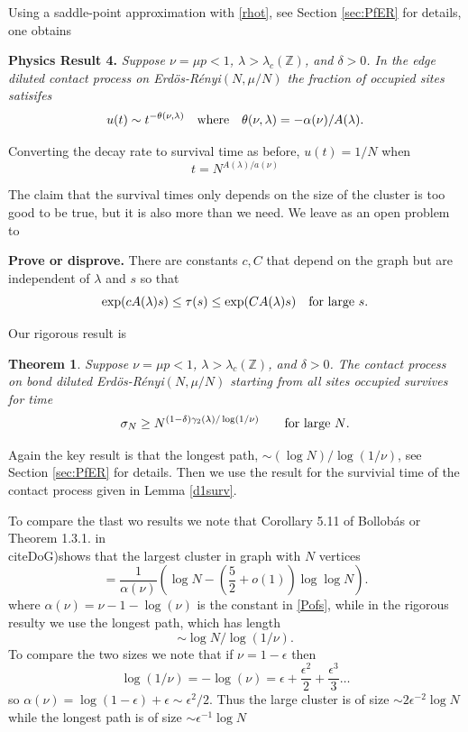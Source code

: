 \documentclass[11pt]{article}
\newtheorem{theorem}{Theorem}
\theoremstyle{definition}
\def\beq{ \begin{equation} }
\def\eeq{ \end{equation} }
\def\mn{\medskip\noindent}
\def\ep{\epsilon}
\def\ZZ{\mathbb{Z}}
\def\ERns{Erd\"os-R\'enyi}
\begin{document}
\noindent
Using a saddle-point approximation with \eqref{rhot}, see Section \ref{sec:PfER} for details, one obtains

\mn
{\bf Physics Result 4.}
{\it Suppose $\nu = \mu p < 1$,  $\lambda > \lambda_c(\ZZ)$, and $\delta>0$.  In the edge diluted contact process on \ERns$(N,\mu/N)$ the fraction of occupied sites
 satisifes}
$$
u(t) \sim t^{-\theta(\nu,\lambda)}\quad\hbox{where}\quad
\theta(\nu,\lambda) = -\alpha(\nu)/A(\lambda).
$$

\mn
Converting the decay rate to survival time as before, $u(t)=1/N$ when 
\beq
t=N^{A(\lambda)/a(\nu)}
\label{physpre}
\eeq


The claim that the survival times only depends on the size of the cluster
is too good to be true, but it is also more than we need. We leave as an open problem to


\mn
{\bf Prove or disprove.} There are constants $c,C$ that depend on the graph but are independent of $\lambda$ and $s$  so that
$$
\exp(cA(\lambda) s ) \le \tau(s) \le \exp(CA(\lambda) s ) \quad \hbox{for large $s$}.
$$



\medskip
Our rigorous result is 


\begin{theorem} \label{GphaseER}
Suppose $\nu = \mu p < 1$,  $\lambda > \lambda_c(\ZZ)$, and $\delta>0$.  The  contact process on bond diluted \ERns$(N,\mu/N)$ starting from all sites occupied survives for time
\beq
\sigma_N \ge N^{(1-\delta) \gamma_2(\lambda)/\log(1/\nu)}
\qquad\hbox{for large $N$.}
\label{ERsurvbd}
\eeq
\end{theorem}

\mn
Again the key result is that the longest path,  $\sim (\log N)/\log(1/\nu)$, see  Section \ref{sec:PfER} for details. Then we use the result for the survivial time of the contact process given in Lemma \ref{d1surv}.


\medskip
To compare the tlast wo results we note that  Corollary 5.11 of Bollob\'as \cite{Boll} or Theorem 1.3.1. in \\cite{DoG})shows that the largest cluster in graph with $N$ vertices
$$
= \frac{1}{\alpha(\nu)}\left( \log N - \left( \frac{5}{2} + o(1) \right) \log\log N \right).
$$ 
where $\alpha(\nu)=\nu-1-\log(\nu)$ is the constant in \eqref{Pofs}, while in the rigorous resulty we use the longest path, which has length 
$$
\sim\log N/ \log(1/\nu). 
$$
To compare the two sizes we note that if $\nu = 1 - \ep$ then  
$$
\log(1/\nu) = - \log(\nu) =  \ep + \frac{\ep^2}{2} +\frac{\ep^3}{3} \ldots
$$
so $\alpha(\nu) =\log(1-\ep) +\ep \sim \ep^2/2$. Thus the large cluster is of size $\sim 2\ep^{-2}\log N$ while the longest path is of size $\sim \ep^{-1} \log N$
\end{document}
